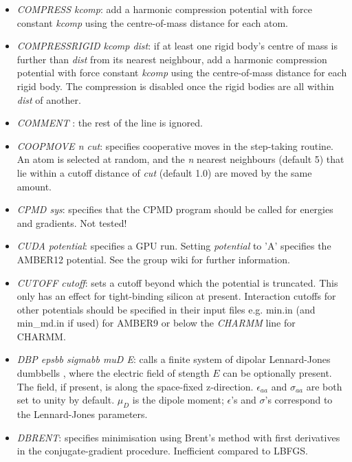\documentclass[12pt,a4paper,dvips]{article}
\begin{document}
\begin{itemize}
\item {\it COMPRESS kcomp\/}: add a harmonic compression potential with force constant {\it kcomp\/} using the
centre-of-mass distance for each atom.

\item {\it COMPRESSRIGID kcomp\/ dist}: if at least one rigid body's centre of mass is further than {\it dist} from its nearest neighbour,  
add a harmonic compression potential with force constant {\it kcomp\/} using the centre-of-mass distance for each rigid body. The compression is 
disabled once the rigid bodies are all within {\it dist} of another. 

\item {\it COMMENT \/}: the rest of the line is ignored.

\item {\it COOPMOVE n cut\/}: specifies cooperative moves in the step-taking routine. An atom is
selected at random, and the {\it n} nearest neighbours (default 5) that lie within a cutoff
distance of {\it cut} (default 1.0) are moved by the same amount.

\item {\it CPMD sys\/}: specifies that the CPMD program should be called for energies and gradients. Not
tested!

\item {\it CUDA potential\/}: specifies a GPU run. Setting {\it potential} to 'A' specifies the AMBER12 potential. See the group wiki for further information. 

\item {\it CUTOFF cutoff\/}: sets a cutoff beyond which the potential is truncated. This
only has an effect for tight-binding silicon at present. Interaction cutoffs for other potentials
should be specified in their input files e.g. {\textrm min.in} (and {\textrm min\_md.in} if used) 
for AMBER9 or below the {\it CHARMM} line for CHARMM.

\item {\it DBP epsbb sigmabb muD E\/}: calls
a finite system of dipolar Lennard-Jones dumbbells \cite{ChakrabartiFW09}, where the electric field of stength $E$ can be
optionally present. The field, if present, is along the space-fixed z-direction. $\epsilon_{aa}$
and $\sigma_{aa}$ are both set to unity by default. $\mu_{D}$ is the dipole moment; $\epsilon$'s
and $\sigma$'s correspond to the Lennard-Jones parameters.

\item {\it DBRENT}: specifies minimisation using Brent's method with first derivatives in the
conjugate-gradient procedure. 
Inefficient compared to LBFGS.


\end{itemize}
\end{document}
